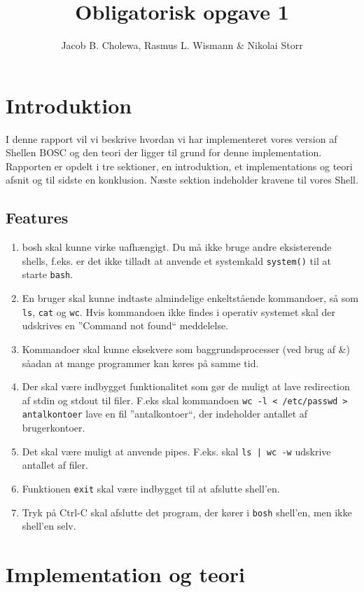 \documentclass[danish]{report}
\title{Obligatorisk opgave 1}
\author{Jacob B. Cholewa, Rasmus L. Wismann \& Nikolai Storr }
\begin{document}
\maketitle
\newpage
\tableofcontents

\chapter{Introduktion}

I denne rapport vil vi beskrive hvordan vi har implementeret vores version af Shellen BOSC og den teori der ligger til grund for denne implementation. Rapporten er opdelt i tre sektioner, en introduktion, et implementations og teori afsnit og til sidste en konklusion. Næste sektion indeholder kravene til vores Shell.  

\section{Features}
\begin{enumerate}
\item bosh skal kunne virke uafhængigt. Du må ikke bruge andre eksisterende shells, f.eks. er det ikke tilladt at anvende et systemkald {\tt system()} til at starte {\tt bash}.
\item En bruger skal kunne indtaste almindelige enkeltstående kommandoer, så som {\tt ls}, {\tt cat} og {\tt wc}. Hvis kommandoen ikke findes i operativ systemet skal der udskrives en ”Command not found“ meddelelse.
\item Kommandoer skal kunne eksekvere som baggrundsprocesser (ved brug af \&) såadan at mange programmer kan køres på samme tid.
\item Der skal være indbygget funktionalitet som gør de muligt at lave redirection af stdin og stdout til filer. F.eks skal kommandoen {\tt wc -l < /etc/passwd > antalkontoer} lave en fil ”antalkontoer“, der indeholder antallet af brugerkontoer.
\item Det skal være muligt at anvende pipes. F.eks. skal {\tt ls | wc -w} udskrive antallet af filer.
\item Funktionen {\tt exit} skal være indbygget til at afslutte shell’en.
\item Tryk på Ctrl-C skal afslutte det program, der kører i {\tt bosh} shell’en, men ikke shell’en selv.
\end{enumerate}

\chapter{Implementation og teori}
\end{document}
